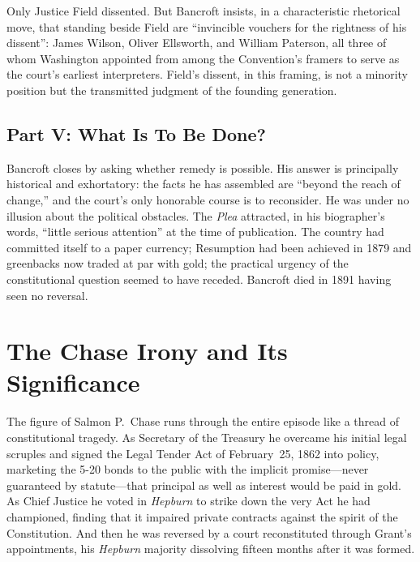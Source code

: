 \documentclass[12pt]{article}
\begin{document}
Only Justice Field dissented. But Bancroft insists, in a characteristic
rhetorical move, that standing beside Field are ``invincible vouchers for
the rightness of his dissent'': James Wilson, Oliver Ellsworth, and
William Paterson, all three of whom Washington appointed from among the
Convention's framers to serve as the court's earliest interpreters.
Field's dissent, in this framing, is not a minority position but the
transmitted judgment of the founding generation.

\subsection{Part V: What Is To Be Done?}

Bancroft closes by asking whether remedy is possible. His answer is
principally historical and exhortatory: the facts he has assembled are
``beyond the reach of change,'' and the court's only honorable course is
to reconsider. He was under no illusion about the political obstacles.
The \textit{Plea} attracted, in his biographer's words, ``little serious
attention'' at the time of publication. The country had committed itself
to a paper currency; Resumption had been achieved in 1879 and greenbacks
now traded at par with gold; the practical urgency of the constitutional
question seemed to have receded. Bancroft died in 1891 having seen no
reversal.

\section{The Chase Irony and Its Significance}

The figure of Salmon P.\ Chase runs through the entire episode like a
thread of constitutional tragedy. As Secretary of the Treasury he
overcame his initial legal scruples and signed the Legal Tender Act of
February~25, 1862 into policy, marketing the 5-20 bonds to the public
with the implicit promise---never guaranteed by statute---that principal
as well as interest would be paid in gold. As Chief Justice he voted
in \textit{Hepburn} to strike down the very Act he had championed,
finding that it impaired private contracts against the spirit of the
Constitution. And then he was reversed by a court reconstituted through
Grant's appointments, his \textit{Hepburn} majority dissolving fifteen
months after it was formed.
\end{document}
